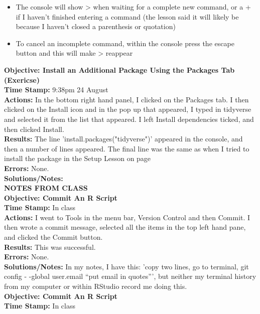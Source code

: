 \documentclass{article}
\begin{document}
\begin{FlushLeft}
\begin{itemize}
    \item The console will show \textgreater{} when waiting for a complete new command, or a + if I haven't finished entering a command (the lesson said it will likely be because I haven't closed a parenthesis or quotation)
    \item To cancel an incomplete command, within the console press the escape button and this will make \textgreater{} reappear
\end{itemize}
\vspace{5mm}
\textbf{Objective: Install an Additional Package Using the Packages Tab (Exericse)}\\ 
\textbf{Time Stamp:} 9:38pm 24 August\\
\textbf{Actions:} In the bottom right hand panel, I clicked on the Packages tab. I then clicked on the Install icon and in the pop up that appeared, I typed in tidyverse and selected it from the list that appeared. I left Install dependencies ticked, and then clicked Install.\\
\textbf{Results:} The line 'install.packages("tidyverse")' appeared in the console, and then a number of lines appeared. The final line was the same as when I tried to install the package in the Setup Lesson on page \pageref{Setup} \\
\textbf{Errors:} None.\\
\textbf{Solutions/Notes:}\\
\vspace{5mm}
\textbf{NOTES FROM CLASS}\\
\textbf{Objective: Commit An R Script}\\ 
\textbf{Time Stamp:} In class\\
\textbf{Actions:} I went to Tools in the menu bar, Version Control and then Commit. I then wrote a commit message, selected all the items in the top left hand pane, and clicked the Commit button.\\
\textbf{Results:} This was successful.\\
\textbf{Errors:} None.\\
\textbf{Solutions/Notes:} In my notes, I have this: 'copy two lines, go to terminal, git config - -global user.email “put email in quotes”', but neither my terminal history from my computer or within RStudio record me doing this.\\
\vspace{5mm}
\textbf{Objective: Commit An R Script}\\ 
\textbf{Time Stamp:} In class\\

\end{FlushLeft}
\end{document}
